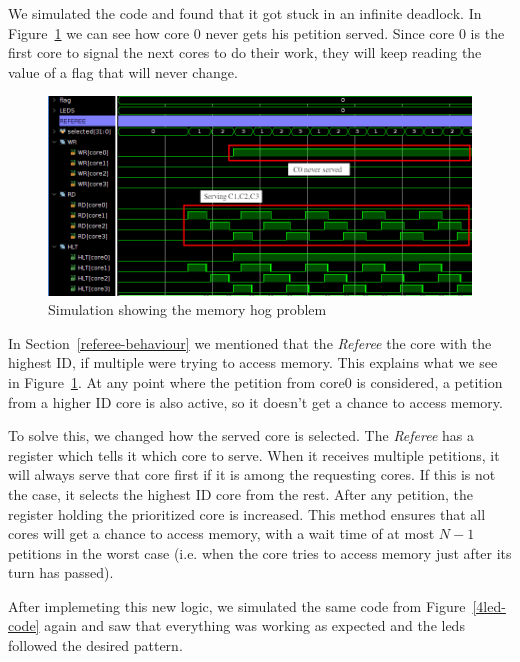 We simulated the code and found that it got stuck in an infinite deadlock.
In Figure~\ref{4led-sim-bad} we can see how core 0 never gets his petition served.
Since core 0 is the first core to signal the next cores to do their work, they will keep reading the value of a flag that will never change.

\begin{figure}[h!]
    \centering
    \includegraphics[width=1.0\textwidth]{images/flag4_sim_bad_crop_arrow.png}
    \caption{Simulation showing the memory hog problem}
    \label{4led-sim-bad}
\end{figure}

In Section~\ref{referee-behaviour} we mentioned that the \textit{Referee} the core with the highest ID, if multiple were trying to access memory. 
This explains what we see in Figure~\ref{4led-sim-bad}.
At any point where the petition from core0 is considered, a petition from a higher ID core is also active, so it doesn't get a chance to access memory.

To solve this, we changed how the served core is selected.
The \textit{Referee} has a register which tells it which core to serve. 
When it receives multiple petitions, it will always serve that core first if it is among the requesting cores.
If this is not the case, it selects the highest ID core from the rest.
After any petition, the register holding the prioritized core is increased.
This method ensures that all cores will get a chance to access memory, with a wait time of at most $N-1$ petitions in the worst case (i.e. when the core tries to access memory just after its turn has passed).


After implemeting this new logic, we simulated the same code from Figure~\ref{4led-code} again and saw that everything was working as expected and the leds followed the desired pattern.

